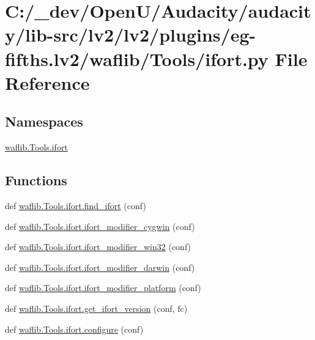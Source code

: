 \hypertarget{lv2_2plugins_2eg-fifths_8lv2_2waflib_2_tools_2ifort_8py}{}\section{C\+:/\+\_\+dev/\+Open\+U/\+Audacity/audacity/lib-\/src/lv2/lv2/plugins/eg-\/fifths.lv2/waflib/\+Tools/ifort.py File Reference}
\label{lv2_2plugins_2eg-fifths_8lv2_2waflib_2_tools_2ifort_8py}
\subsection*{Namespaces}
\begin{DoxyCompactItemize}
\item 
 \hyperlink{namespacewaflib_1_1_tools_1_1ifort}{waflib.\+Tools.\+ifort}
\end{DoxyCompactItemize}
\subsection*{Functions}
\begin{DoxyCompactItemize}
\item 
def \hyperlink{namespacewaflib_1_1_tools_1_1ifort_aa6838492a72ffb343c49d099cbbe1a25}{waflib.\+Tools.\+ifort.\+find\+\_\+ifort} (conf)
\item 
def \hyperlink{namespacewaflib_1_1_tools_1_1ifort_aa44d118aa83e088e0ab4e7ab47d662de}{waflib.\+Tools.\+ifort.\+ifort\+\_\+modifier\+\_\+cygwin} (conf)
\item 
def \hyperlink{namespacewaflib_1_1_tools_1_1ifort_a89fe1b18d4886bfeec97636459f81d35}{waflib.\+Tools.\+ifort.\+ifort\+\_\+modifier\+\_\+win32} (conf)
\item 
def \hyperlink{namespacewaflib_1_1_tools_1_1ifort_a3078d523f12c208147b3ee500f2cbd99}{waflib.\+Tools.\+ifort.\+ifort\+\_\+modifier\+\_\+darwin} (conf)
\item 
def \hyperlink{namespacewaflib_1_1_tools_1_1ifort_a468f9dd549fcae601c2733fae8e70e25}{waflib.\+Tools.\+ifort.\+ifort\+\_\+modifier\+\_\+platform} (conf)
\item 
def \hyperlink{namespacewaflib_1_1_tools_1_1ifort_afde0bb56d9602a855a6357c8021ace77}{waflib.\+Tools.\+ifort.\+get\+\_\+ifort\+\_\+version} (conf, fc)
\item 
def \hyperlink{namespacewaflib_1_1_tools_1_1ifort_a2eceee8c0f041a660b0759d18822b668}{waflib.\+Tools.\+ifort.\+configure} (conf)
\end{DoxyCompactItemize}
